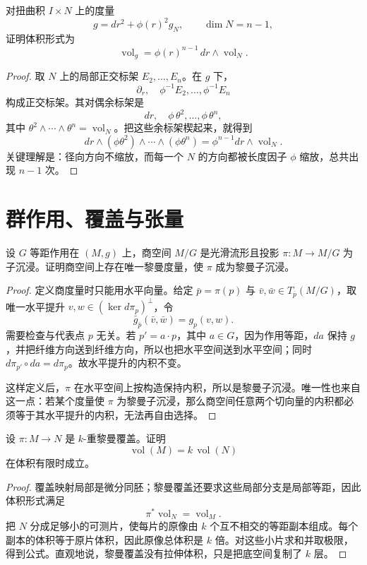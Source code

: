 \documentclass[11pt,a4paper,openany]{ctexbook}
\numberwithin{equation}{chapter}
\begin{document}
\begin{problem}
对扭曲积 \(I\times N\) 上的度量
\[
g=dr^2+\phi(r)^2g_N,\qquad \dim N=n-1,
\]
证明体积形式为
\[
\operatorname{vol}_g=\phi(r)^{n-1}\,dr\wedge \operatorname{vol}_{N}.
\]
\end{problem}
\begin{proof}
取 \(N\) 上的局部正交标架 \(E_2,\ldots,E_n\)。在 \(g\) 下，
\[
\partial_r,\quad \phi^{-1}E_2,\ldots,\phi^{-1}E_n
\]
构成正交标架。其对偶余标架是
\[
dr,\quad \phi\,\theta^2,\ldots,\phi\,\theta^n,
\]
其中 \(\theta^2\wedge\cdots\wedge\theta^n=\operatorname{vol}_N\)。把这些余标架楔起来，就得到
\[
dr\wedge(\phi\theta^2)\wedge\cdots\wedge(\phi\theta^n)
=\phi^{n-1}dr\wedge\operatorname{vol}_N.
\]
关键理解是：径向方向不缩放，而每一个 \(N\) 的方向都被长度因子 \(\phi\) 缩放，总共出现 \(n-1\) 次。
\end{proof}

\section{群作用、覆盖与张量}

\begin{problem}
设 \(G\) 等距作用在 \((M,g)\) 上，商空间 \(M/G\) 是光滑流形且投影 \(\pi\colon M\to M/G\) 为子沉浸。证明商空间上存在唯一黎曼度量，使 \(\pi\) 成为黎曼子沉浸。
\end{problem}
\begin{proof}
定义商度量时只能用水平向量。给定 \(\bar p=\pi(p)\) 与 \(\bar v,\bar w\in T_{\bar p}(M/G)\)，取唯一水平提升 \(v,w\in(\ker d\pi_p)^\perp\)，令
\[
\bar g_{\bar p}(\bar v,\bar w)=g_p(v,w).
\]
需要检查与代表点 \(p\) 无关。若 \(p'=a\cdot p\)，其中 \(a\in G\)，因为作用等距，\(da\) 保持 \(g\)，并把纤维方向送到纤维方向，所以也把水平空间送到水平空间；同时 \(d\pi_{p'}\circ da=d\pi_p\)。故水平提升的内积不变。

这样定义后，\(\pi\) 在水平空间上按构造保持内积，所以是黎曼子沉浸。唯一性也来自这一点：若某个度量使 \(\pi\) 为黎曼子沉浸，那么商空间任意两个切向量的内积都必须等于其水平提升的内积，无法再自由选择。
\end{proof}

\begin{problem}
设 \(\pi\colon M\to N\) 是 \(k\)-重黎曼覆盖。证明
\[
\operatorname{vol}(M)=k\,\operatorname{vol}(N)
\]
在体积有限时成立。
\end{problem}
\begin{proof}
覆盖映射局部是微分同胚；黎曼覆盖还要求这些局部分支是局部等距，因此体积形式满足
\[
\pi^*\operatorname{vol}_N=\operatorname{vol}_M.
\]
把 \(N\) 分成足够小的可测片，使每片的原像由 \(k\) 个互不相交的等距副本组成。每个副本的体积等于原片体积，因此原像总体积是 \(k\) 倍。对这些小片求和并取极限，得到公式。直观地说，黎曼覆盖没有拉伸体积，只是把底空间复制了 \(k\) 层。
\end{proof}
\end{document}
